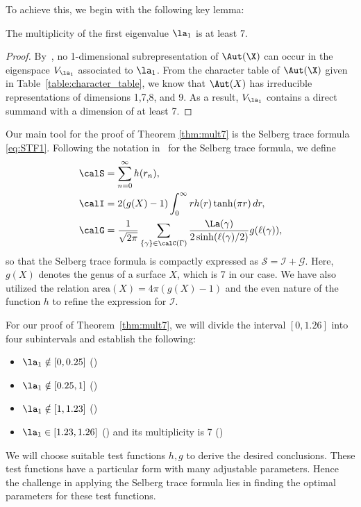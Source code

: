 To achieve this, we begin with the following key lemma:
\begin{lemma}\label{prop:mult7}
The multiplicity of the first eigenvalue $\la_1$ is at least 7.
\end{lemma}
\begin{proof}
By~\cite[Lemma 9.2]{FBP23}, no 1-dimensional subrepresentation of $\Aut(\X)$ can occur in the eigenspace $V_{\la_1}$ associated to $\la_1$.
From the character table of $\Aut(\X)$ given in Table~\ref{table:character_table}, we know that $\Aut(X)$ has irreducible representations of dimensions 1,7,8, and 9.
As a result, $V_{\la_1}$ contains a direct summand with a dimension of at least 7.
\end{proof}

Our main tool for the proof of Theorem \ref{thm:mult7} is the Selberg trace formula \eqref{eq:STF1}.
Following the notation in~\cite{FBP21} for the Selberg trace formula, we define
\begin{align*}
\calS &= \sum_{n=0}^{\infty} h(r_{n}),\\
\calI &= 2(g(X)-1)\int_0^\infty r h(r) \tanh (\pi r)\, dr,\\
\calG &= \frac{1}{\sqrt{2\pi}}\sum_{\{\gamma\} \in \calC(\Gamma)} \frac{\La(\gamma)}{2 \sinh(\ell(\gamma)/2)} g(\ell(\gamma)),\\
\end{align*}
so that the Selberg trace formula is compactly expressed as \(\mathcal{S} = \mathcal{I} + \mathcal{G}\).
Here, \(g(X)\) denotes the genus of a surface \(X\), which is 7 in our case.
We have also utilized the relation \(\mathrm{area}(X) = 4\pi (g(X) - 1)\) and the even nature of the function \(h\) to refine the expression for \(\mathcal{I}\).

For our proof of Theorem~\ref{thm:mult7}, we will divide the interval $[0,1.26]$ into four subintervals and establish the following:
\begin{itemize}
    \item $\la_1 \notin [0, 0.25]$ ()
    \item $\la_1 \notin [0.25, 1]$ ()
    \item $\la_1 \notin [1, 1.23]$ ()
    \item $\la_1 \in [1.23, 1.26]$ () and its multiplicity is 7 ()
\end{itemize}
We will choose suitable test functions $h,g$ to derive the desired conclusions.
These test functions have a particular form with many adjustable parameters.
Hence the challenge in applying the Selberg trace formula lies in finding the optimal parameters for these test functions.


